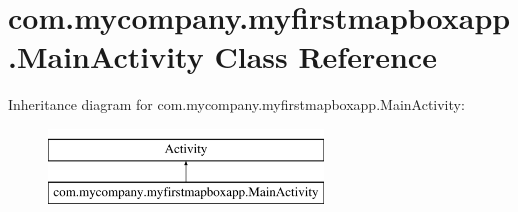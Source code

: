 \hypertarget{classcom_1_1mycompany_1_1myfirstmapboxapp_1_1_main_activity}{}\section{com.\+mycompany.\+myfirstmapboxapp.\+Main\+Activity Class Reference}
\label{classcom_1_1mycompany_1_1myfirstmapboxapp_1_1_main_activity}
Inheritance diagram for com.\+mycompany.\+myfirstmapboxapp.\+Main\+Activity\+:\begin{figure}[H]
\begin{center}
\leavevmode
\includegraphics[height=2.000000cm]{classcom_1_1mycompany_1_1myfirstmapboxapp_1_1_main_activity}
\end{center}
\end{figure}
